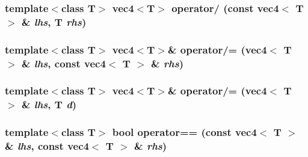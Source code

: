 \hypertarget{classnv_1_1vec4_6b55551a180bd0607a442da9bb6ccea8}{
\subsubsection[{operator/}]{\setlength{\rightskip}{0pt plus 5cm}template$<$class T$>$ {\bf vec4}$<$T$>$ operator/ (const {\bf vec4}$<$ T $>$ \& {\em lhs}, \/  T {\em rhs})}}
\label{classnv_1_1vec4_6b55551a180bd0607a442da9bb6ccea8}


\hypertarget{classnv_1_1vec4_19980a11fa7178d3cb0d8ca2380fbd8e}{
\subsubsection[{operator/=}]{\setlength{\rightskip}{0pt plus 5cm}template$<$class T$>$ {\bf vec4}$<$T$>$\& operator/= ({\bf vec4}$<$ T $>$ \& {\em lhs}, \/  const {\bf vec4}$<$ T $>$ \& {\em rhs})}}
\label{classnv_1_1vec4_19980a11fa7178d3cb0d8ca2380fbd8e}


\hypertarget{classnv_1_1vec4_0c2ce7247eaf12932a608e657e3aec52}{
\subsubsection[{operator/=}]{\setlength{\rightskip}{0pt plus 5cm}template$<$class T$>$ {\bf vec4}$<$T$>$\& operator/= ({\bf vec4}$<$ T $>$ \& {\em lhs}, \/  T {\em d})}}
\label{classnv_1_1vec4_0c2ce7247eaf12932a608e657e3aec52}


\hypertarget{classnv_1_1vec4_f17126e65a8b03eaab3cc44f09d298d0}{
\subsubsection[{operator==}]{\setlength{\rightskip}{0pt plus 5cm}template$<$class T$>$ bool operator== (const {\bf vec4}$<$ T $>$ \& {\em lhs}, \/  const {\bf vec4}$<$ T $>$ \& {\em rhs})}}
\label{classnv_1_1vec4_f17126e65a8b03eaab3cc44f09d298d0}




